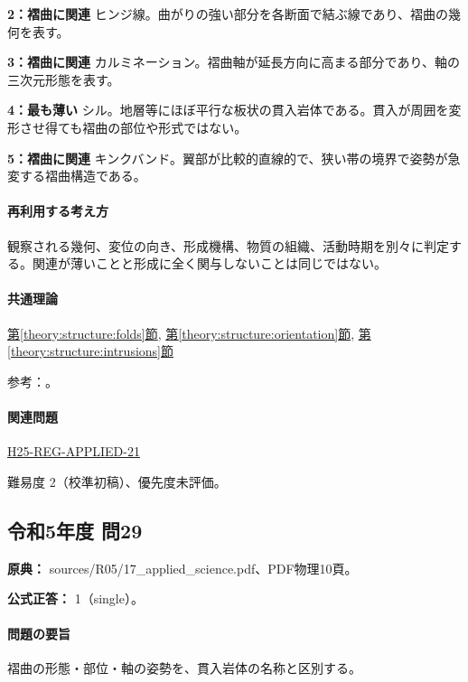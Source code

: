 \noindent\textbf{2：褶曲に関連} ヒンジ線。曲がりの強い部分を各断面で結ぶ線であり、褶曲の幾何を表す。\par

\noindent\textbf{3：褶曲に関連} カルミネーション。褶曲軸が延長方向に高まる部分であり、軸の三次元形態を表す。\par

\noindent\textbf{4：最も薄い} シル。地層等にほぼ平行な板状の貫入岩体である。貫入が周囲を変形させ得ても褶曲の部位や形式ではない。\par

\noindent\textbf{5：褶曲に関連} キンクバンド。翼部が比較的直線的で、狭い帯の境界で姿勢が急変する褶曲構造である。\par

\paragraph{再利用する考え方} 観察される幾何、変位の向き、形成機構、物質の組織、活動時期を別々に判定する。関連が薄いことと形成に全く関与しないことは同じではない。

\paragraph{共通理論} \hyperref[theory:structure:folds]{第\ref*{theory:structure:folds}節}, \hyperref[theory:structure:orientation]{第\ref*{theory:structure:orientation}節}, \hyperref[theory:structure:intrusions]{第\ref*{theory:structure:intrusions}節}

\par 参考：\cite{str_intrusion,str_fold}。

\paragraph{関連問題} \hyperref[q:h25-reg-applied-21]{H25-REG-APPLIED-21}

\par 難易度 2（校準初稿）、優先度未評価。

\subsection{令和5年度 問29}
\label{q:r05-reg-applied-29}

\noindent\textbf{原典：} sources/R05/17\_applied\_science.pdf、PDF物理10頁。

\textbf{公式正答：} 1（single）。

\paragraph{問題の要旨} 褶曲の形態・部位・軸の姿勢を、貫入岩体の名称と区別する。

